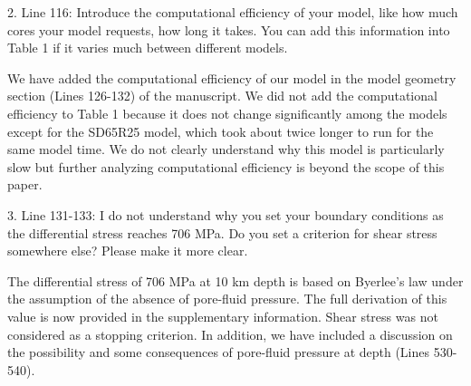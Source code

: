 \documentclass[12pt]{article}
\begin{document}
\begin{response}{2. Line 116: Introduce the computational efficiency of your model, like how much cores your model requests, how long it takes. You can add this information into Table 1 if it varies much between different models.}

  We have added the computational efficiency of our model in the model geometry section (Lines 126-132) of the manuscript. We did not add the computational efficiency to Table 1 because it does not change significantly among the models except for the SD65R25 model, which took about twice longer to run for the same model time. We do not clearly understand why this model is particularly slow but further analyzing computational efficiency is beyond the scope of this paper.
  
\end{response}


\begin{response}{3. Line 131-133: I do not understand why you set your boundary conditions as the differential stress reaches 706 MPa. Do you set a criterion for shear stress somewhere else? Please make it more clear.}

  The differential stress of 706 MPa at 10 km depth is based on Byerlee's law under the assumption of  
  the absence of pore-fluid pressure. The full derivation of this value is now provided in the supplementary information. Shear stress was not considered as a stopping criterion. In addition, we have included a discussion on the possibility and some consequences of pore-fluid pressure at depth (Lines 530-540).
  
\end{response}
\end{document}
